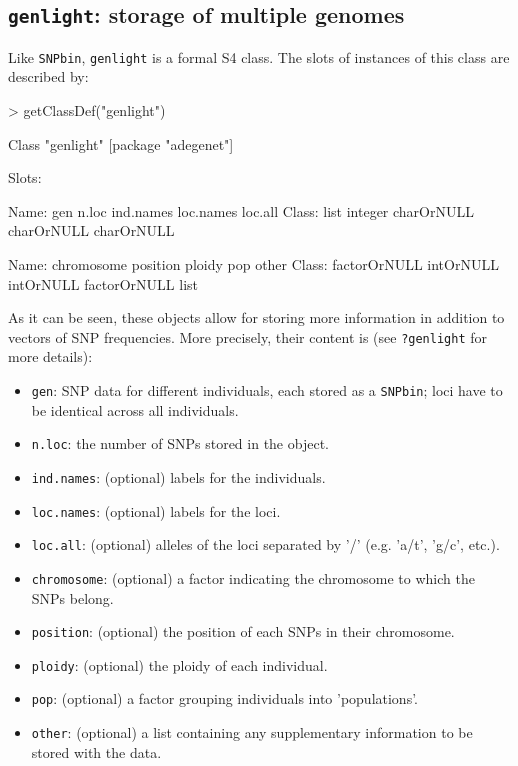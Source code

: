 \documentclass{article}
\newcommand{\code}[1]{{{\tt #1}}}
\begin{document}
\subsection{\code{genlight}: storage of multiple genomes}

Like \texttt{SNPbin}, \texttt{genlight} is a formal S4 class.
The slots of instances of this class are described by:
\begin{Schunk}
\begin{Sinput}
> getClassDef("genlight")
\end{Sinput}
\begin{Soutput}
Class "genlight" [package "adegenet"]

Slots:
                                                                       
Name:           gen        n.loc    ind.names    loc.names      loc.all
Class:         list      integer   charOrNULL   charOrNULL   charOrNULL
                                                                       
Name:    chromosome     position       ploidy          pop        other
Class: factorOrNULL    intOrNULL    intOrNULL factorOrNULL         list
\end{Soutput}
\end{Schunk}
As it can be seen, these objects allow for storing more information in addition to vectors of SNP frequencies.
More precisely, their content is (see \texttt{?genlight} for more details):
\begin{itemize}
  \item \texttt{gen}: SNP data for different individuals, each stored as a \texttt{SNPbin}; loci
    have to be identical across all individuals.
  \item \texttt{n.loc}: the number of SNPs stored in the object.
  \item \texttt{ind.names}: (optional) labels for the individuals.
  \item \texttt{loc.names}: (optional) labels for the loci.
  \item \texttt{loc.all}: (optional) alleles of the loci separated by '/' (e.g. 'a/t', 'g/c', etc.).
  \item \texttt{chromosome}: (optional) a factor indicating the chromosome to which the SNPs belong.
  \item \texttt{position}: (optional) the position of each SNPs in their chromosome.
  \item \texttt{ploidy}: (optional) the ploidy of each individual.
  \item \texttt{pop}: (optional) a factor grouping individuals into 'populations'.
  \item \texttt{other}: (optional) a list containing any supplementary information to be stored with
    the data.
\end{itemize}
\end{document}
